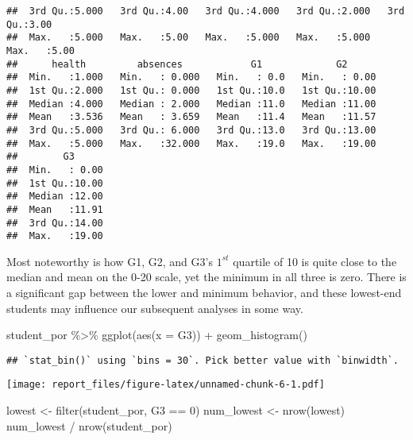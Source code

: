 \documentclass[
]{article}
\newenvironment{Shaded}{\begin{snugshade}}{\end{snugshade}}
\newcommand{\AttributeTok}[1]{\textcolor[rgb]{0.77,0.63,0.00}{#1}}
\newcommand{\DecValTok}[1]{\textcolor[rgb]{0.00,0.00,0.81}{#1}}
\newcommand{\FunctionTok}[1]{\textcolor[rgb]{0.00,0.00,0.00}{#1}}
\newcommand{\NormalTok}[1]{#1}
\newcommand{\OtherTok}[1]{\textcolor[rgb]{0.56,0.35,0.01}{#1}}
\newcommand{\SpecialCharTok}[1]{\textcolor[rgb]{0.00,0.00,0.00}{#1}}
\begin{document}
\begin{verbatim}
##  3rd Qu.:5.000   3rd Qu.:4.00   3rd Qu.:4.000   3rd Qu.:2.000   3rd Qu.:3.00  
##  Max.   :5.000   Max.   :5.00   Max.   :5.000   Max.   :5.000   Max.   :5.00  
##      health         absences            G1             G2       
##  Min.   :1.000   Min.   : 0.000   Min.   : 0.0   Min.   : 0.00  
##  1st Qu.:2.000   1st Qu.: 0.000   1st Qu.:10.0   1st Qu.:10.00  
##  Median :4.000   Median : 2.000   Median :11.0   Median :11.00  
##  Mean   :3.536   Mean   : 3.659   Mean   :11.4   Mean   :11.57  
##  3rd Qu.:5.000   3rd Qu.: 6.000   3rd Qu.:13.0   3rd Qu.:13.00  
##  Max.   :5.000   Max.   :32.000   Max.   :19.0   Max.   :19.00  
##        G3       
##  Min.   : 0.00  
##  1st Qu.:10.00  
##  Median :12.00  
##  Mean   :11.91  
##  3rd Qu.:14.00  
##  Max.   :19.00
\end{verbatim}

Most noteworthy is how G1, G2, and G3's \(1^{st}\) quartile of 10 is
quite close to the median and mean on the 0-20 scale, yet the minimum in
all three is zero. There is a significant gap between the lower and
minimum behavior, and these lowest-end students may influence our
subsequent analyses in some way.

\begin{Shaded}
\begin{Highlighting}[]
\NormalTok{student\_por }\SpecialCharTok{\%\textgreater{}\%} 
  \FunctionTok{ggplot}\NormalTok{(}\FunctionTok{aes}\NormalTok{(}\AttributeTok{x =}\NormalTok{ G3)) }\SpecialCharTok{+}
  \FunctionTok{geom\_histogram}\NormalTok{()}
\end{Highlighting}
\end{Shaded}

\begin{verbatim}
## `stat_bin()` using `bins = 30`. Pick better value with `binwidth`.
\end{verbatim}

\texttt{[image: report\_files/figure-latex/unnamed-chunk-6-1.pdf]}

\begin{Shaded}
\begin{Highlighting}[]
\NormalTok{lowest }\OtherTok{\textless{}{-}} \FunctionTok{filter}\NormalTok{(student\_por, G3 }\SpecialCharTok{==} \DecValTok{0}\NormalTok{)}
\NormalTok{num\_lowest }\OtherTok{\textless{}{-}} \FunctionTok{nrow}\NormalTok{(lowest)}
\NormalTok{num\_lowest }\SpecialCharTok{/} \FunctionTok{nrow}\NormalTok{(student\_por)}
\end{Highlighting}
\end{Shaded}
\end{document}
